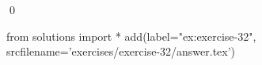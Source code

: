 
\begin{ex} 
  \label{ex:exercise-32}
  
  \qed
\end{ex} 
\begin{python0}
from solutions import *
add(label="ex:exercise-32",
    srcfilename='exercises/exercise-32/answer.tex') 
\end{python0}
